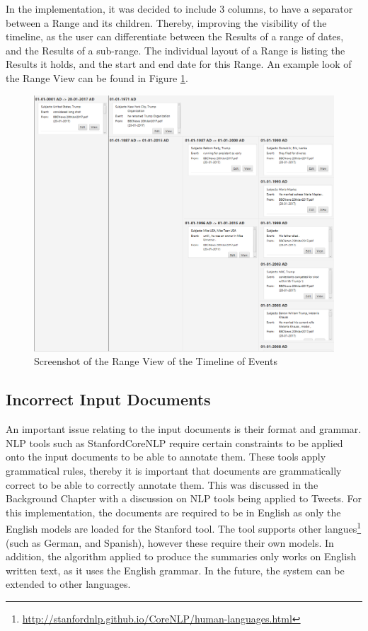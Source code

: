 \par  In the implementation, it was decided to include 3 columns, to have a separator between a Range and its children. Thereby, improving the visibility of the timeline, as the user can differentiate between the Results of a range of dates, and the Results of a sub-range. The individual layout of a Range is listing the Results it holds, and the start and end date for this Range. An example look of the Range View can be found in Figure \ref{fig:rangeView}.

\begin{figure}[H]
\caption{Screenshot of the Range View of the Timeline of Events}
\label{fig:rangeView}
\includegraphics[width=\linewidth]{rangeView.png}
\centering
\end{figure}
\subsection{Incorrect Input Documents}

\par An important issue relating to the input documents is their format and grammar. NLP tools such as StanfordCoreNLP require certain constraints to be applied onto the input documents to be able to annotate them. These tools apply grammatical rules, thereby it is important that documents are grammatically correct to be able to correctly annotate them. This was discussed in the Background Chapter with a discussion on NLP tools being applied to Tweets. For this implementation, the documents are required to be in English as only the English models are loaded for the Stanford tool. The tool supports other langues\footnote{\url{http://stanfordnlp.github.io/CoreNLP/human-languages.html}} (such as German, and Spanish), however these require their own models. In addition, the algorithm applied to produce the summaries only works on English written text, as it uses the English grammar. In the future, the system can be extended to other languages.

